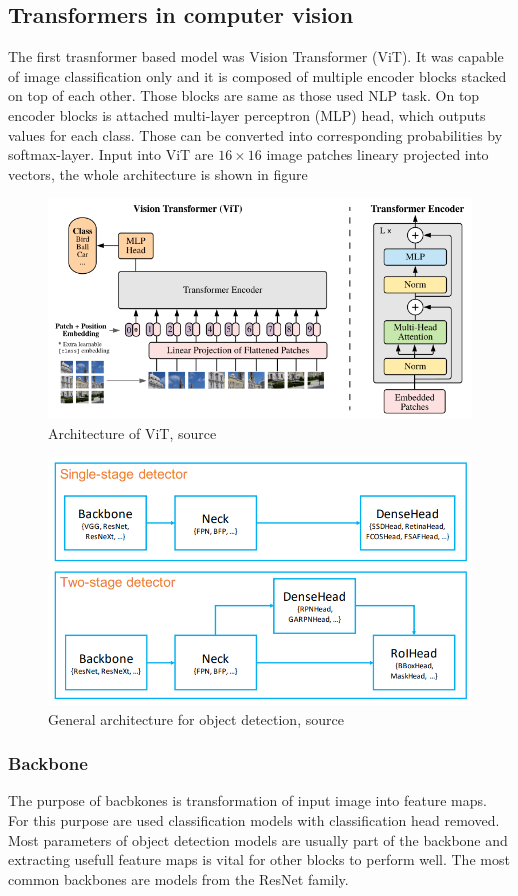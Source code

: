 \subsection{Transformers in computer vision}
The first trasnformer based model was Vision Transformer (ViT). It was capable of image classification only and it is composed of multiple encoder blocks stacked on top of each other. Those blocks are same as those used NLP task. On top encoder blocks is attached multi-layer perceptron (MLP) head, which outputs values for each class. Those can be converted into corresponding probabilities by softmax-layer. Input into ViT are $16 \times 16$ image patches lineary projected into vectors, the whole architecture is shown in figure
\begin{figure}
    \centering
    \includegraphics[width=\linewidth]{images/vision_transformer.png}
    \caption{Architecture of ViT, source \cite{Dosovitskiy2020}}
    \label{fig:vision_transformer}
\end{figure}


\begin{figure}
    \centering
    \includegraphics[width=0.6\linewidth]{images/object_detection_architecture.png}
    \caption{General architecture for object detection, source \cite{Chen2019}}
    \label{fig:object_detection_architecture}
\end{figure}

\subsubsection{Backbone}
The purpose of bacbkones is transformation of input image into feature maps. For this purpose are used classification models with classification head removed. Most parameters of object detection models are usually part of the backbone and extracting usefull feature maps is vital for other blocks to perform well. The most common backbones are models from the ResNet family.

